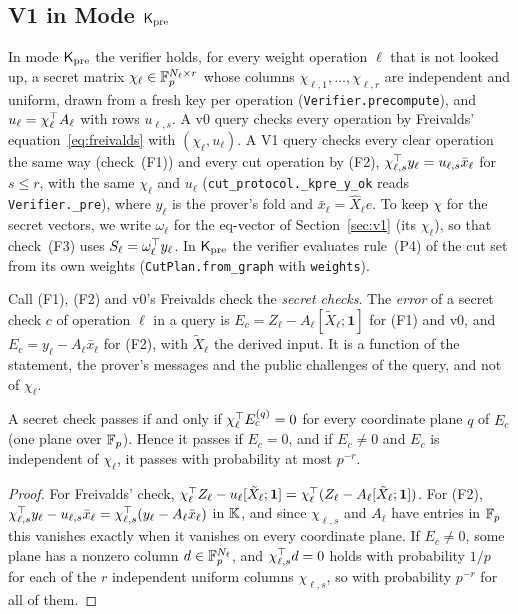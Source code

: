 \subsection{V1 in Mode \texorpdfstring{$\mathsf{K}_{\mathrm{pre}}$}{Kpre}}
\label{app:v1kpre}

 In mode $\mathsf{K}_{\mathrm{pre}}$ the verifier holds, for every weight operation $\ell$ that is not
looked up, a secret matrix $\chi_\ell\in\mathbb{F}_p^{N_\ell\times r}$ whose columns
$\chi_{\ell,1},\dots,\chi_{\ell,r}$ are independent and uniform, drawn from a fresh key per
operation (\texttt{Verifier.precompute}), and $u_\ell=\chi_\ell^\top A_\ell$ with rows $u_{\ell,s}$.
A v0 query checks every operation by Freivalds' equation~\eqref{eq:freivalds} with
$(\chi_\ell,u_\ell)$. A V1 query checks every clear operation the same way (check~(F1)) and every
cut operation by (F2), $\chi_{\ell,s}^\top y_\ell=u_{\ell,s}\bar x_\ell$ for $s\le r$, with the same
$\chi_\ell$ and $u_\ell$ (\texttt{cut\_protocol.\_kpre\_y\_ok} reads \texttt{Verifier.\_pre}), where
$y_\ell$ is the prover's fold and $\bar x_\ell=\hat X_\ell e$. To keep $\chi$ for the secret
vectors, we write $\omega_\ell$ for the eq-vector of Section~\ref{sec:v1} (its $\chi_\ell$), so that
check~(F3) uses $S_\ell=\omega_\ell^\top y_\ell$. In $\mathsf{K}_{\mathrm{pre}}$ the verifier evaluates rule~(P4) of the
cut set from its own weights (\texttt{CutPlan.from\_graph} with \texttt{weights}).

 Call (F1), (F2) and v0's Freivalds check the \emph{secret
checks}. The \emph{error} of a secret check $c$ of operation $\ell$ in a query is
$E_c=Z_\ell-A_\ell[\tilde X_\ell;\mathbf 1]$ for (F1) and v0, and $E_c=y_\ell-A_\ell\bar x_\ell$ for
(F2), with $\tilde X_\ell$ the derived input. It is a function of the statement, the prover's
messages and the public challenges of the query, and not of $\chi_\ell$.

\begin{lemma}
\label{lem:secret-check}
A secret check passes if and only if $\chi_\ell^\top E^{(q)}_c=0$ for every coordinate plane $q$ of
$E_c$ (one plane over $\mathbb{F}_p$). Hence it passes if $E_c=0$, and if $E_c\neq0$ and $E_c$ is independent
of $\chi_\ell$, it passes with probability at most $p^{-r}$.
\end{lemma}

\begin{proof}
For Freivalds' check, $\chi_\ell^\top Z_\ell-u_\ell[\tilde X_\ell;\mathbf 1]
=\chi_\ell^\top(Z_\ell-A_\ell[\tilde X_\ell;\mathbf 1])$. For (F2),
$\chi_{\ell,s}^\top y_\ell-u_{\ell,s}\bar x_\ell=\chi_{\ell,s}^\top(y_\ell-A_\ell\bar x_\ell)$ in
$\mathbb{K}$, and since $\chi_{\ell,s}$ and $A_\ell$ have entries in $\mathbb{F}_p$ this vanishes exactly when it
vanishes on every coordinate plane. If $E_c\neq0$, some plane has a nonzero column $d\in\mathbb{F}_p^{N_\ell}$,
and $\chi_{\ell,s}^\top d=0$ holds with probability $1/p$ for each of the $r$ independent uniform
columns $\chi_{\ell,s}$, so with probability $p^{-r}$ for all of them.
\end{proof}

